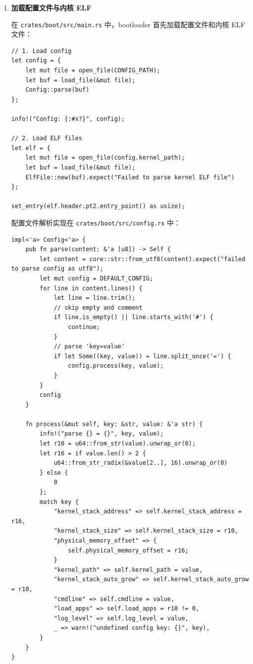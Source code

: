 \documentclass{SYSUReport}
\begin{document}
\begin{enumerate}[label={\chinese*、},labelsep=0pt, start=2]

    \item \textbf{加载配置文件与内核 ELF}

    在 \texttt{crates/boot/src/main.rs} 中，bootloader 首先加载配置文件和内核 ELF 文件：

    \begin{verbatim}
// 1. Load config
let config = {
    let mut file = open_file(CONFIG_PATH);
    let buf = load_file(&mut file);
    Config::parse(buf)
};

info!("Config: {:#x?}", config);

// 2. Load ELF files
let elf = {
    let mut file = open_file(config.kernel_path);
    let buf = load_file(&mut file);
    ElfFile::new(buf).expect("Failed to parse kernel ELF file")
};

set_entry(elf.header.pt2.entry_point() as usize);
    \end{verbatim}

    配置文件解析实现在 \texttt{crates/boot/src/config.rs} 中：

    \begin{verbatim}
impl<'a> Config<'a> {
    pub fn parse(content: &'a [u8]) -> Self {
        let content = core::str::from_utf8(content).expect("failed to parse config as utf8");
        let mut config = DEFAULT_CONFIG;
        for line in content.lines() {
            let line = line.trim();
            // skip empty and comment
            if line.is_empty() || line.starts_with('#') {
                continue;
            }
            // parse 'key=value'
            if let Some((key, value)) = line.split_once('=') {
                config.process(key, value);
            }
        }
        config
    }

    fn process(&mut self, key: &str, value: &'a str) {
        info!("parse {} = {}", key, value);
        let r10 = u64::from_str(value).unwrap_or(0);
        let r16 = if value.len() > 2 {
            u64::from_str_radix(&value[2..], 16).unwrap_or(0)
        } else {
            0
        };
        match key {
            "kernel_stack_address" => self.kernel_stack_address = r16,
            "kernel_stack_size" => self.kernel_stack_size = r10,
            "physical_memory_offset" => {
                self.physical_memory_offset = r16;
            }
            "kernel_path" => self.kernel_path = value,
            "kernel_stack_auto_grow" => self.kernel_stack_auto_grow = r10,
            "cmdline" => self.cmdline = value,
            "load_apps" => self.load_apps = r10 != 0,
            "log_level" => self.log_level = value,
            _ => warn!("undefined config key: {}", key),
        }
    }
}
    \end{verbatim}


\end{enumerate}
\end{document}
